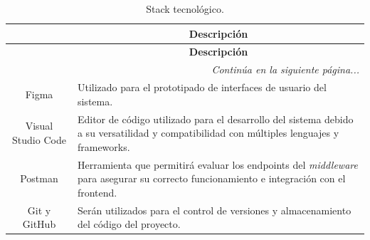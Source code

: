 \begin{longtable}[c]{|c|m{}|}
    \caption{Stack tecnológico.}
    \label{tab:stackTecnologico} \\
    \hline
    \rowcolor{gray!50}
    \multicolumn{1}{|c|}{\textbf{Herramienta}} & \multicolumn{1}{c|}{\textbf{Descripción}} \\
    \hline
    \endfirsthead

    \hline
    \rowcolor{gray!50}
    \multicolumn{1}{|c|}{\textbf{Herramienta}} & \multicolumn{1}{c|}{\textbf{Descripción}} \\
    \hline
    \endhead

    \multicolumn{2}{r}{\textit{Continúa en la siguiente página...}} \\
    \endfoot

    \endlastfoot

    Figma & Utilizado para el prototipado de interfaces de usuario del sistema. \\
    \hline
    Visual Studio Code & Editor de código utilizado para el desarrollo del sistema debido a su versatilidad y compatibilidad con múltiples lenguajes y frameworks.\\
    \hline
    Postman & Herramienta que permitirá evaluar los endpoints del \textit{middleware} para asegurar su correcto funcionamiento e integración con el frontend. \\
    \hline
    Git y GitHub & Serán utilizados para el control de versiones y  almacenamiento del código del proyecto. \\
    \hline
\end{longtable}
